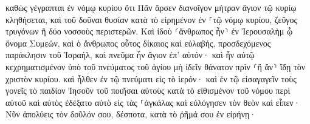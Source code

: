 \documentclass{openreader}
\begin{document}
καθὼς γέγραπται ἐν νόμῳ κυρίου ὅτι Πᾶν ἄρσεν διανοῖγον μήτραν ἅγιον τῷ κυρίῳ κληθήσεται, 
καὶ τοῦ δοῦναι θυσίαν κατὰ τὸ εἰρημένον ἐν ⸀τῷ νόμῳ κυρίου, ζεῦγος τρυγόνων ἢ δύο νοσσοὺς περιστερῶν. 
Καὶ ἰδοὺ ⸂ἄνθρωπος ἦν⸃ ἐν Ἰερουσαλὴμ ᾧ ὄνομα Συμεών, καὶ ὁ ἄνθρωπος οὗτος δίκαιος καὶ εὐλαβής, προσδεχόμενος παράκλησιν τοῦ Ἰσραήλ, καὶ πνεῦμα ἦν ἅγιον ἐπ’ αὐτόν· 
καὶ ἦν αὐτῷ κεχρηματισμένον ὑπὸ τοῦ πνεύματος τοῦ ἁγίου μὴ ἰδεῖν θάνατον πρὶν ⸂ἢ ἂν⸃ ἴδῃ τὸν χριστὸν κυρίου. 
καὶ ἦλθεν ἐν τῷ πνεύματι εἰς τὸ ἱερόν· καὶ ἐν τῷ εἰσαγαγεῖν τοὺς γονεῖς τὸ παιδίον Ἰησοῦν τοῦ ποιῆσαι αὐτοὺς κατὰ τὸ εἰθισμένον τοῦ νόμου περὶ αὐτοῦ 
καὶ αὐτὸς ἐδέξατο αὐτὸ εἰς τὰς ⸀ἀγκάλας καὶ εὐλόγησεν τὸν θεὸν καὶ εἶπεν· 
Νῦν ἀπολύεις τὸν δοῦλόν σου, δέσποτα, κατὰ τὸ ῥῆμά σου ἐν εἰρήνῃ· 
\end{document}
